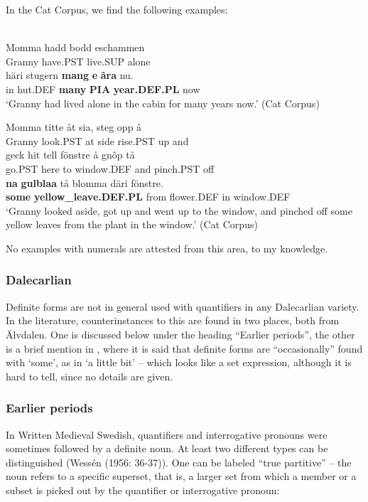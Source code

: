 \z

In the Cat Corpus, we find the following examples:

\ea\label{}
\\
\gll Momma  hadd  bodd  eschammen\\
Granny  have.PST  live.SUP  alone\\
\gll häri  stugern  \textbf{mang} \textbf{  e} \textbf{  åra} nu.\\
in  hut.DEF  \textbf{many} \textbf{PIA} \textbf{year.DEF.PL} now\\
\glt ‘Granny had lived alone in the cabin for many years now.’ (Cat Corpus)

\z

\ea
\gll Momma  titte  åt  sia,   steg  opp  å\\
Granny  look.PST  at  side  rise.PST  up  and\\
\gll geck  hit  tell  fönstre  å  gnôp  tå\\
go.PST  here  to  window.DEF  and  pinch.PST  off\\
\gll \textbf{na} \textbf{  gulblaa} tå  blomma  däri  fönstre.\\
\textbf{some} \textbf{yellow\_leave.DEF.PL} from  flower.DEF  in  window.DEF\\
\glt ‘Granny looked aside, got up and went up to the window, and pinched off some yellow leaves from the plant in the window.’ (Cat Corpus)

\z

No examples with numerals are attested from this area, to my knowledge.

\subsubsection{Dalecarlian}
Definite forms are not in general used with quantifiers in any Dalecarlian variety. In the literature, counterinstances to this are found in two places, both from Älvdalen. One is discussed below under the heading “Earlier periods”, the other is a brief mention in \citet[95]{Levander1909}, where it is said that definite forms are “occasionally” found with ‘some’, as in ‘a little bit’ – which looks like a set expression, although it is hard to tell, since no details are given.

\subsubsection{Earlier periods}
 In Written Medieval Swedish, quantifiers and interrogative pronouns were sometimes followed by a definite noun. At least two different types can be distinguished (Wessén (1956: 36-37)). One can be labeled “true partitive” – the noun refers to a specific superset, that is, a larger set from which a member or a subset is picked out by the quantifier or interrogative pronoun:

